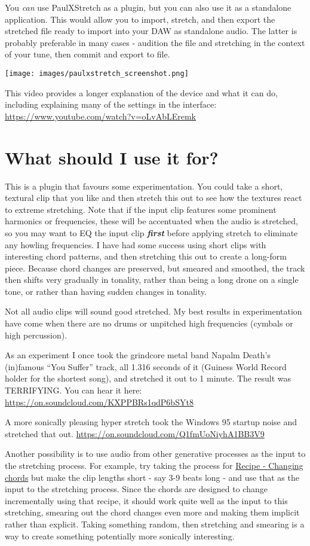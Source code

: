 \documentclass[
  12pt,
  letterpaper,
  oneside,
  open=any]{scrbook}
\begin{document}
You \emph{can} use PaulXStretch as a plugin, but you can also use it as
a standalone application. This would allow you to import, stretch, and
then export the stretched file ready to import into your DAW as
standalone audio. The latter is probably preferable in many cases -
audition the file and stretching in the context of your tune, then
commit and export to file.

\texttt{[image: images/paulxstretch\_screenshot.png]}

This video provides a longer explanation of the device and what it can
do, including explaining many of the settings in the interface:
\url{https://www.youtube.com/watch?v=oLvAbLEremk}

\section{What should I use it for?}\label{what-should-i-use-it-for}

This is a plugin that favours some experimentation. You could take a
short, textural clip that you like and then stretch this out to see how
the textures react to extreme stretching. Note that if the input clip
features some prominent harmonics or frequencies, these will be
accentuated when the audio is stretched, so you may want to EQ the input
clip \textbf{\emph{first}} before applying stretch to eliminate any
howling frequencies. I have had some success using short clips with
interesting chord patterns, and then stretching this out to create a
long-form piece. Because chord changes are preserved, but smeared and
smoothed, the track then shifts very gradually in tonality, rather than
being a long drone on a single tone, or rather than having sudden
changes in tonality.

Not all audio clips will sound good stretched. My best results in
experimentation have come when there are no drums or unpitched high
frequencies (cymbals or high percussion).

As an experiment I once took the grindcore metal band Napalm Death's
(in)famous ``You Suffer'' track, all 1.316 seconds of it (Guiness World
Record holder for the shortest song), and stretched it out to 1 minute.
The result was TERRIFYING. You can hear it here:
\url{https://on.soundcloud.com/KXPPBRs1qdP6bSYt8}

A more sonically pleasing hyper stretch took the Windows 95 startup
noise and stretched that out.
\url{https://on.soundcloud.com/Q1fmUoNiyhA1BB3V9}

Another possibility is to use audio from other generative processes as
the input to the stretching process. For example, try taking the process
for \hyperref[Chapter-001-Recipe-Changing_Chords]{Recipe - Changing
chords} but make the clip lengths short - say 3-9 beats long - and use
that as the input to the stretching process. Since the chords are
designed to change incrementally using that recipe, it should work quite
well as the input to this stretching, smearing out the chord changes
even more and making them implicit rather than explicit. Taking
something random, then stretching and smearing is a way to create
something potentially more sonically interesting.
\end{document}
